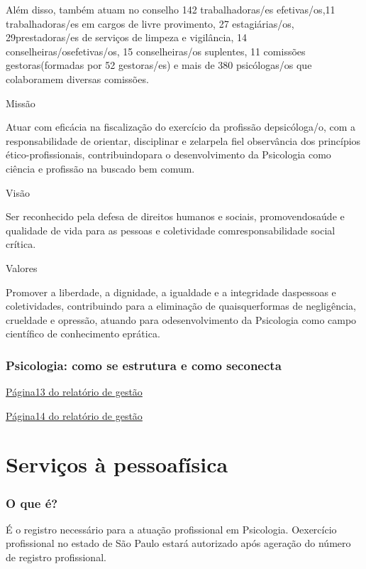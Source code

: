 Além disso, também atuam no conselho 142 trabalhadoras/es efetivas/os,11 trabalhadoras/es em cargos de livre provimento, 27 estagiárias/os, 29prestadoras/es de serviços de limpeza e vigilância, 14 conselheiras/osefetivas/os, 15 conselheiras/os suplentes, 11 comissões gestoras(formadas por 52 gestoras/es) e mais de 380 psicólogas/os que colaboramem diversas comissões.

Missão

Atuar com eficácia na fiscalização do exercício da profissão depsicóloga/o, com a responsabilidade de orientar, disciplinar e zelarpela fiel observância dos princípios ético-profissionais, contribuindopara o desenvolvimento da Psicologia como ciência e profissão na buscado bem comum.

Visão

Ser reconhecido pela defesa de direitos humanos e sociais, promovendosaúde e qualidade de vida para as pessoas e coletividade comresponsabilidade social crítica.

Valores

Promover a liberdade, a dignidade, a igualdade e a integridade daspessoas e coletividades, contribuindo para a eliminação de quaisquerformas de negligência, crueldade e opressão, atuando para odesenvolvimento da Psicologia como campo científico de conhecimento eprática.

\section{Psicologia: como se estrutura e como seconecta}

\href{https://d.docs.live.net/c339283d8975e0ad/revisão/Fwd\%20Carta\%20de\%20Serviços\%20CRP\%20SP/Relatorio-de-gestao_2023_CRPSP-13.pdf}{Página13 do relatório de gestão}

\href{https://d.docs.live.net/c339283d8975e0ad/revisão/Fwd\%20Carta\%20de\%20Serviços\%20CRP\%20SP/Relatorio-de-gestao_2023_CRPSP-14.pdf}{Página14 do relatório de gestão}

\part{Serviços à pessoafísica}

\section{O que é?}

É o registro necessário para a atuação profissional em Psicologia. Oexercício profissional no estado de São Paulo estará autorizado após ageração do número de registro profissional.

